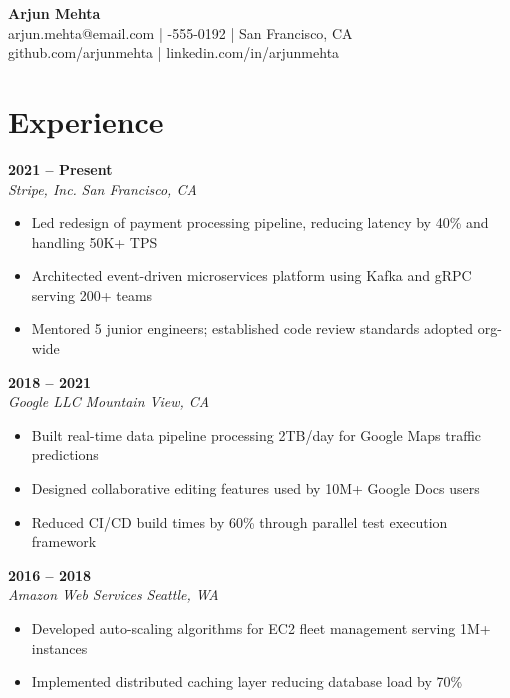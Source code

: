 \documentclass[10pt,letterpaper]{article}
\begin{document}
\begin{center}
{\fontsize{28}{34}\selectfont\bfseries\color{darktext} Arjun Mehta}\\[6pt]
{\normalsize arjun.mehta@email.com \enspace | -555-0192 \enspace | \enspace San Francisco, CA}\\[2pt]
{\normalsize\color{accent} github.com/arjunmehta \enspace | \enspace linkedin.com/in/arjunmehta}
\end{center}

\section{Experience}

 \hfill {\bfseries 2021 -- Present}\\
{\itshape\color{accent} Stripe, Inc.} \hfill {\itshape San Francisco, CA}
\begin{itemize}[leftmargin=1.2em, topsep=2pt, itemsep=0pt, parsep=1pt]
  \item Led redesign of payment processing pipeline, reducing latency by 40\% and handling 50K+ TPS
  \item Architected event-driven microservices platform using Kafka and gRPC serving 200+ teams
  \item Mentored 5 junior engineers; established code review standards adopted org-wide
\end{itemize}

\vspace{4pt}
 \hfill {\bfseries 2018 -- 2021}\\
{\itshape\color{accent} Google LLC} \hfill {\itshape Mountain View, CA}
\begin{itemize}[leftmargin=1.2em, topsep=2pt, itemsep=0pt, parsep=1pt]
  \item Built real-time data pipeline processing 2TB/day for Google Maps traffic predictions
  \item Designed collaborative editing features used by 10M+ Google Docs users
  \item Reduced CI/CD build times by 60\% through parallel test execution framework
\end{itemize}

\vspace{4pt}
 \hfill {\bfseries 2016 -- 2018}\\
{\itshape\color{accent} Amazon Web Services} \hfill {\itshape Seattle, WA}
\begin{itemize}[leftmargin=1.2em, topsep=2pt, itemsep=0pt, parsep=1pt]
  \item Developed auto-scaling algorithms for EC2 fleet management serving 1M+ instances
  \item Implemented distributed caching layer reducing database load by 70\%
\end{itemize}
\end{document}
